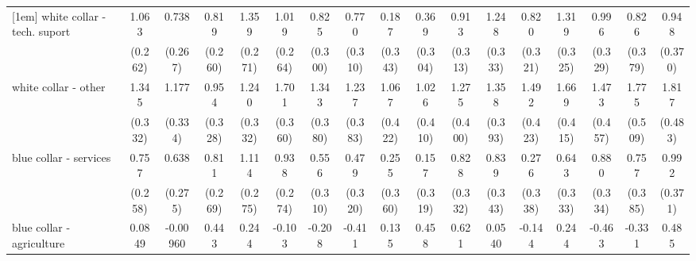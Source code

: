 {\begin{tabular}{l*{16}{c}}
[1em]
white collar - tech. suport&       1.063\sym{***}&       0.738\sym{**} &       0.819\sym{**} &       1.359\sym{***}&       1.019\sym{***}&       0.825\sym{**} &       0.770\sym{*}  &       0.187         &       0.369         &       0.913\sym{**} &       1.248\sym{***}&       0.820\sym{*}  &       1.319\sym{***}&       0.996\sym{**} &       0.826\sym{*}  &       0.948\sym{*}  \\
                    &     (0.262)         &     (0.267)         &     (0.260)         &     (0.271)         &     (0.264)         &     (0.300)         &     (0.310)         &     (0.343)         &     (0.304)         &     (0.313)         &     (0.333)         &     (0.321)         &     (0.325)         &     (0.329)         &     (0.379)         &     (0.370)         \\
[1em]
white collar - other&       1.345\sym{***}&       1.177\sym{***}&       0.954\sym{**} &       1.240\sym{***}&       1.701\sym{***}&       1.343\sym{***}&       1.237\sym{**} &       1.067\sym{*}  &       1.026\sym{*}  &       1.275\sym{**} &       1.358\sym{***}&       1.492\sym{***}&       1.669\sym{***}&       1.473\sym{**} &       1.775\sym{***}&       1.817\sym{***}\\
                    &     (0.332)         &     (0.334)         &     (0.328)         &     (0.332)         &     (0.360)         &     (0.380)         &     (0.383)         &     (0.422)         &     (0.410)         &     (0.400)         &     (0.393)         &     (0.423)         &     (0.415)         &     (0.457)         &     (0.509)         &     (0.483)         \\
[1em]
blue collar - services&       0.757\sym{**} &       0.638\sym{*}  &       0.811\sym{**} &       1.114\sym{***}&       0.938\sym{***}&       0.556         &       0.479         &       0.255         &       0.157         &       0.828\sym{*}  &       0.839\sym{*}  &       0.276         &       0.643         &       0.880\sym{**} &       0.757\sym{*}  &       0.992\sym{**} \\
                    &     (0.258)         &     (0.275)         &     (0.269)         &     (0.275)         &     (0.274)         &     (0.310)         &     (0.320)         &     (0.360)         &     (0.319)         &     (0.332)         &     (0.343)         &     (0.338)         &     (0.333)         &     (0.334)         &     (0.385)         &     (0.371)         \\
[1em]
blue collar - agriculture&      0.0849         &    -0.00960         &       0.443         &       0.244         &      -0.103         &      -0.208         &      -0.411         &       0.135         &       0.458         &       0.621         &      0.0540         &      -0.144         &       0.244         &      -0.463         &      -0.331         &       0.485         \\

\end{tabular}}
